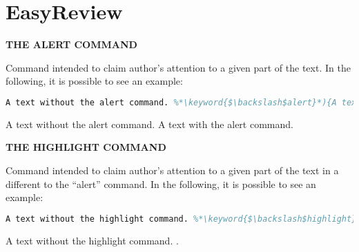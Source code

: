 \chapter{{\normalfont EasyReview}}


\renewcommand\lstlistingname{Example}
\newcommand{\keyword}[1]{\textbf{\color{purple!60!black}{#1}}}

\textbf{\uppercase {The alert command}}

Command intended to claim author's attention to a given part of the text. In the following, it is possible to see an example:

\begin{center}
\begin{minipage}[ht]{0.45\textwidth}
\begin{lstlisting}[language=tex]
A text without the alert command. %*\keyword{$\backslash$alert}*){A text with the alert command}.
\end{lstlisting}
\end{minipage}
\hspace{10pt}
\begin{minipage}[ht]{0.45\textwidth}
A text without the alert command. \alert{A text with the alert command}.
\end{minipage}
\end{center}

\textbf{\uppercase {The highlight command}}

Command intended to claim author's attention to a given part of the text in a different to the ``alert'' command. In the following, it is possible to see an example:

\begin{center}
\begin{minipage}[ht]{0.45\textwidth}
\begin{lstlisting}[language=tex]
A text without the highlight command. %*\keyword{$\backslash$highlight}*){A text with the highlight command}.
\end{lstlisting}
\end{minipage}
\hspace{10pt}
\begin{minipage}[ht]{0.45\textwidth}
A text without the highlight command. .
\end{minipage}
\end{center}

